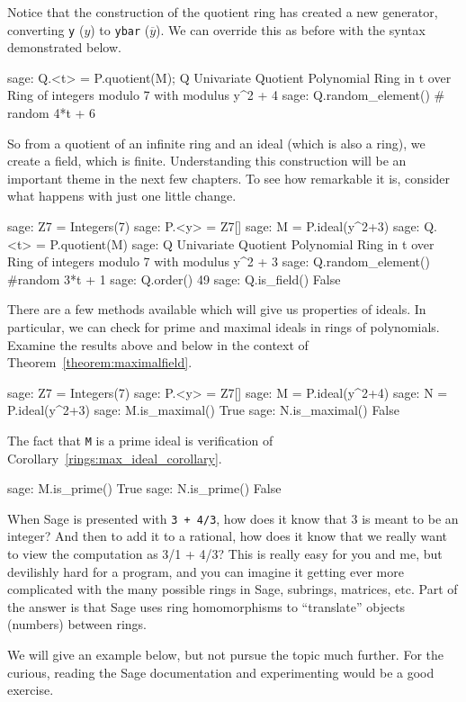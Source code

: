 %
Notice that the construction of the quotient ring has created a new generator, converting \verb?y? ($y$) to \verb?ybar? ($\overline{y}$).  We can override this as before with the syntax demonstrated below.
%
\begin{sageexample}
sage: Q.<t> = P.quotient(M); Q
Univariate Quotient Polynomial Ring in t over
Ring of integers modulo 7 with modulus y^2 + 4
sage: Q.random_element() # random
4*t + 6
\end{sageexample}
%
So from a quotient of an infinite ring and an ideal (which is also a ring), we create a field, which is finite.  Understanding this construction will be an important theme in the next few chapters.  To see how remarkable it is, consider what happens with just one little change.
%
\begin{sageexample}
sage: Z7 = Integers(7)
sage: P.<y> = Z7[]
sage: M = P.ideal(y^2+3)
sage: Q.<t> = P.quotient(M)
sage: Q
Univariate Quotient Polynomial Ring in t over
Ring of integers modulo 7 with modulus y^2 + 3
sage: Q.random_element() #random
3*t + 1
sage: Q.order()
49
sage: Q.is_field()
False
\end{sageexample}
%
There are a few methods available which will give us properties of ideals.  In particular, we can check for prime and maximal ideals in rings of polynomials.  Examine the results above and below in the context of Theorem~\ref{theorem:maximalfield}.
%
\begin{sageexample}
sage: Z7 = Integers(7)
sage: P.<y> = Z7[]
sage: M = P.ideal(y^2+4)
sage: N = P.ideal(y^2+3)
sage: M.is_maximal()
True
sage: N.is_maximal()
False
\end{sageexample}
%
The fact that \verb?M? is a prime ideal is verification of Corollary~\ref{rings:max_ideal_corollary}.
%
\begin{sageexample}
sage: M.is_prime()
True
sage: N.is_prime()
False
\end{sageexample}
%
%
When Sage is presented with \verb?3 + 4/3?, how does it know that 3 is meant to be an integer? And then to add it to a rational, how does it know that we really want to view the computation as 3/1 + 4/3?  This is really easy for you and me, but devilishly hard for a program, and you can imagine it getting ever more complicated with the many possible rings in Sage, subrings, matrices, etc.  Part of the answer is that Sage uses ring homomorphisms to ``translate'' objects (numbers) between rings.\par
%
We will give an example below, but not pursue the topic much further.  For the curious, reading the Sage documentation and experimenting would be a good exercise.
